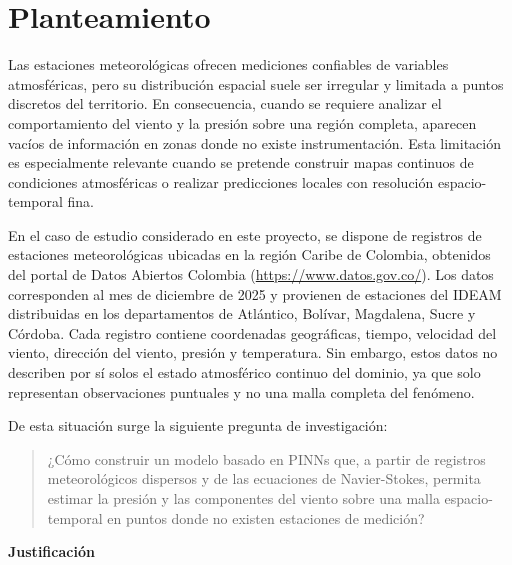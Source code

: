 \chapter*{Planteamiento}

Las estaciones meteorológicas ofrecen mediciones confiables de variables atmosféricas, pero su distribución espacial suele ser irregular y limitada a puntos discretos del territorio. En consecuencia, cuando se requiere analizar el comportamiento del viento y la presión sobre una región completa, aparecen vacíos de información en zonas donde no existe instrumentación. Esta limitación es especialmente relevante cuando se pretende construir mapas continuos de condiciones atmosféricas o realizar predicciones locales con resolución espacio-temporal fina.

En el caso de estudio considerado en este proyecto, se dispone de registros de estaciones meteorológicas ubicadas en la región Caribe de Colombia, obtenidos del portal de Datos Abiertos Colombia (\url{https://www.datos.gov.co/}). Los datos corresponden al mes de diciembre de 2025 y provienen de estaciones del IDEAM distribuidas en los departamentos de Atlántico, Bolívar, Magdalena, Sucre y Córdoba. Cada registro contiene coordenadas geográficas, tiempo, velocidad del viento, dirección del viento, presión y temperatura. Sin embargo, estos datos no describen por sí solos el estado atmosférico continuo del dominio, ya que solo representan observaciones puntuales y no una malla completa del fenómeno.

De esta situación surge la siguiente pregunta de investigación:

\begin{quote}
¿Cómo construir un modelo basado en PINNs que, a partir de registros meteorológicos dispersos y de las ecuaciones de Navier-Stokes, permita estimar la presión y las componentes del viento sobre una malla espacio-temporal en puntos donde no existen estaciones de medición?
\end{quote}

\textbf{Justificación}

